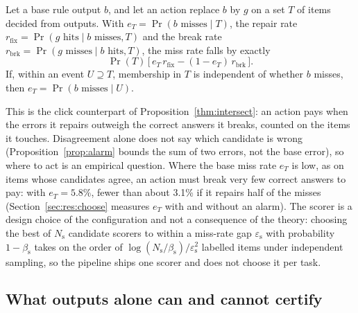 \begin{proposition}\label{prop:switch}
Let a base rule output $b$, and let an action replace $b$ by $g$ on a set $T$ of items decided from outputs. With $e_T=\Pr(b\text{ misses}\mid T)$, the repair rate $r_{\mathrm{fix}}=\Pr(g\text{ hits}\mid b\text{ misses},T)$ and the break rate $r_{\mathrm{brk}}=\Pr(g\text{ misses}\mid b\text{ hits},T)$, the miss rate falls by exactly
\[
\Pr(T)\,\big[\,e_T\,r_{\mathrm{fix}}-(1-e_T)\,r_{\mathrm{brk}}\,\big].
\]
If, within an event $U\supseteq T$, membership in $T$ is independent of whether $b$ misses, then $e_T=\Pr(b\text{ misses}\mid U)$.
\end{proposition}

This is the click counterpart of Proposition~\ref{thm:intersect}: an action pays when the errors it repairs outweigh the correct answers it breaks, counted on the items it touches. Disagreement alone does not say which candidate is wrong (Proposition~\ref{prop:alarm} bounds the sum of two errors, not the base error), so where to act is an empirical question. Where the base miss rate $e_T$ is low, as on items whose candidates agree, an action must break very few correct answers to pay: with $e_T=5.8\%$, fewer than about 3.1\% if it repairs half of the misses (Section~\ref{sec:res:choose} measures $e_T$ with and without an alarm). The scorer is a design choice of the configuration and not a consequence of the theory: choosing the best of $N_{\mathrm{s}}$ candidate scorers to within a miss-rate gap $\varepsilon_{\mathrm{s}}$ with probability $1-\beta_{\mathrm{s}}$ takes on the order of $\log(N_{\mathrm{s}}/\beta_{\mathrm{s}})/\varepsilon_{\mathrm{s}}^2$ labelled items under independent sampling, so the pipeline ships one scorer and does not choose it per task.

\subsection{What outputs alone can and cannot certify}\label{sec:theory:cert}

